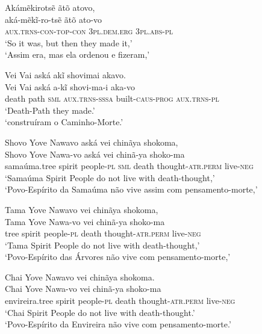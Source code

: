 \documentclass[output=paper,
modfonts,nonflat
]{langsci/langscibook}
\begin{document}

\ea Akámẽkirotsẽ ãtõ atovo, \\[.3em]
\gll aká-mẽkĩ-ro-tsẽ               ãtõ                  ato-vo              \\
     \textsc{aux.trns-con-top-con} 3\textsc{pl.dem.erg} 3\textsc{pl.abs-pl} \\
\glt `So it was, but then they made it,' \\
`Assim era, mas ela ordenou e fizeram,'\\
\z

\ea Vei Vai aská akĩ shovimai akavo. \\[.3em]
\gll Vei   Vai  aská         a-kĩ                   shovi-ma-i               aka-vo               \\
     death path \textsc{sml} \textsc{aux.trns-sssa} built-\textsc{caus-prog} \textsc{aux.trns-pl} \\
\glt `Death-Path they made.' \\
`construíram o Caminho-Morte.'\\
\z

\ea Shovo Yove Nawavo aská vei chinãya shokoma, \\[.3em]
\gll Shovo        Yove   Nawa-vo            aská         vei   chinã-ya                  shoko-ma          \\
     samaúma.tree spirit people-\textsc{pl} \textsc{sml} death thought-\textsc{atr.perm} live-\textsc{neg} \\
\glt `Samaúma Spirit People do not live with death-thought,' \\
`Povo-Espírito da Samaúma não vive assim com pensamento-morte,'\\
\z

\ea Tama Yove Nawavo vei chinãya shokoma, \\[.3em]
\gll Tama Yove   Nawa-vo            vei   chinã-ya                  shoko-ma          \\
     tree spirit people-\textsc{pl} death thought-\textsc{atr.perm} live-\textsc{neg} \\
\glt `Tama Spirit People do not live with death-thought,' \\
`Povo-Espírito das Árvores não vive com pensamento-morte,'\\
\z

\ea Chai Yove Nawavo vei chinãya shokoma. \\[.3em]
\gll Chai           Yove   Nawa-vo            vei   chinã-ya                  shoko-ma          \\
     envireira.tree spirit people-\textsc{pl} death thought-\textsc{atr.perm} live-\textsc{neg} \\
\glt `Chai Spirit People do not live with death-thought.' \\
`Povo-Espírito da Envireira não vive com pensamento-morte.' \\
\z
\end{document}
